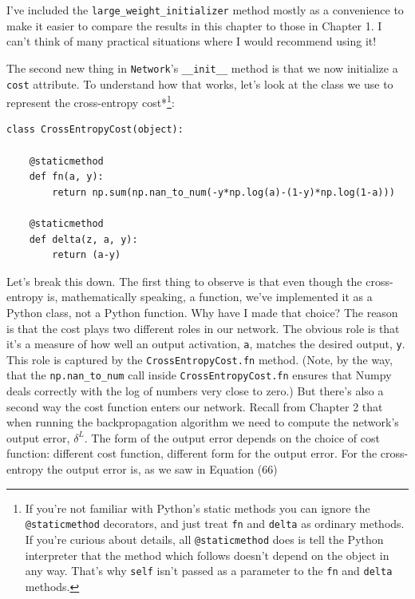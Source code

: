 I've included the \texttt{large\_\allowbreak{}weight\_\allowbreak{}initializer} method mostly as a convenience to make it easier to compare the results in this chapter to those in Chapter 1. I can't think of many practical situations where I would recommend using it!


The second new thing in \texttt{Network}'s \texttt{\_\allowbreak{}\_\allowbreak{}init\_\allowbreak{}\_\allowbreak{}} method is that we now initialize a \texttt{cost} attribute. To understand how that works, let's look at the class we use to represent the cross-entropy cost*\footnote{If you're not familiar with Python's static methods you can ignore the \texttt{@staticmethod} decorators, and just treat \texttt{fn} and \texttt{delta} as ordinary methods. If you're curious about details, all \texttt{@staticmethod} does is tell the Python interpreter that the method which follows doesn't depend on the object in any way. That's why \texttt{self} isn't passed as a parameter to the \texttt{fn} and \texttt{delta} methods.}:



\begin{lstlisting}
class CrossEntropyCost(object):

    @staticmethod
    def fn(a, y):
        return np.sum(np.nan_to_num(-y*np.log(a)-(1-y)*np.log(1-a)))

    @staticmethod
    def delta(z, a, y):
        return (a-y)

\end{lstlisting}


Let's break this down. The first thing to observe is that even though the cross-entropy is, mathematically speaking, a function, we've implemented it as a Python class, not a Python function. Why have I made that choice? The reason is that the cost plays two different roles in our network. The obvious role is that it's a measure of how well an output activation, \texttt{a}, matches the desired output, \texttt{y}. This role is captured by the \texttt{CrossEntropyCost.fn} method. (Note, by the way, that the \texttt{np.nan\_\allowbreak{}to\_\allowbreak{}num} call inside \texttt{CrossEntropyCost.fn} ensures that Numpy deals correctly with the log of numbers very close to zero.) But there's also a second way the cost function enters our network. Recall from Chapter 2 that when running the backpropagation algorithm we need to compute the network's output error, $\delta^L$. The form of the output error depends on the choice of cost function: different cost function, different form for the output error. For the cross-entropy the output error is, as we saw in Equation (66)

